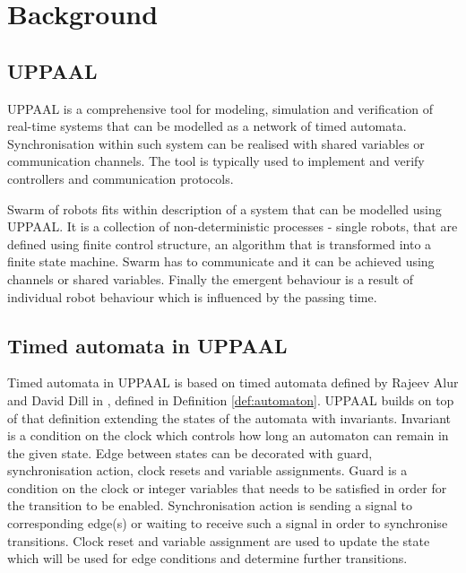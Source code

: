\section{Background}

\subsection{UPPAAL}
UPPAAL is a comprehensive tool for modeling, simulation and verification of real-time systems that can be modelled as a network of timed automata. Synchronisation within such system can be realised with shared variables or communication channels. The tool is typically used to implement and verify controllers and communication protocols.
\cite{UPPAAL_in_a_Nutshell}

Swarm of robots fits within description of a system that can be modelled using UPPAAL. It is a collection of non-deterministic processes - single robots, that are defined using finite control structure, an algorithm that is transformed into a finite state machine. Swarm has to communicate and it can be achieved using channels or shared variables. Finally the emergent behaviour is a result of individual robot behaviour which is influenced by the passing time.


\subsection{Timed automata in UPPAAL}
Timed automata in UPPAAL is based on timed automata defined by Rajeev Alur and David Dill in \cite{Automata_For_Modeling_Real-Time_Systems}, defined in Definition \ref{def:automaton}. UPPAAL builds on top of that definition extending the states of the automata with invariants. Invariant is a condition on the clock which controls how long an automaton can remain in the given state. Edge between states can be decorated with guard, synchronisation action, clock resets and variable assignments. Guard is a condition on the clock or integer variables that needs to be satisfied in order for the transition to be enabled. Synchronisation action is sending a signal to corresponding edge(s) or waiting to receive such a signal in order to synchronise transitions. Clock reset and variable assignment are used to update the state which will be used for edge conditions and determine further transitions. \cite{UPPAAL_in_a_Nutshell}

